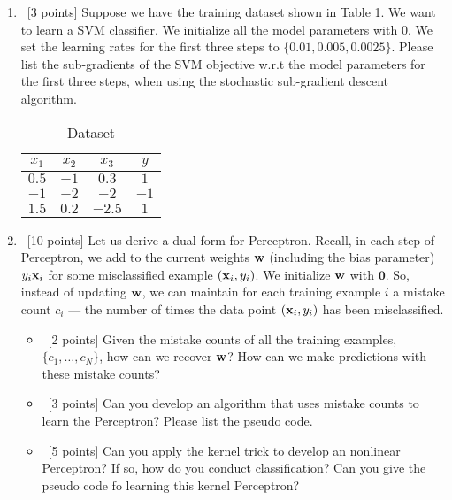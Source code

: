\documentclass[12pt, fullpage,letterpaper]{article}
\begin{document}
\begin{enumerate}
	
	\item~[3 points] Suppose we have the training dataset shown in Table 1. We want to learn a SVM classifier. We initialize all the model parameters with $0$. We set the learning rates for the first three steps to $\{0.01, 0.005, 0.0025\}$.  Please list the sub-gradients of the SVM objective w.r.t the model parameters for the first three steps, when using the stochastic sub-gradient descent algorithm. 
	\begin{table}[h]
		\centering
		\begin{tabular}{ccc|c}
			$x_1$ & $x_2$ & $x_3$ &  $y$\\ 
			\hline\hline
			$0.5$ & $-1$ & $0.3$ & $1$ \\ \hline
			$-1$ & $-2$ & $-2$ & $-1$\\ \hline
			$1.5$ & $0.2$ & $-2.5$ & $1$\\ \hline
		\end{tabular}
	\caption{Dataset}
	\end{table}

	\item~[10 points] Let us derive a dual form for Perceptron. Recall, in each step of Perceptron, we add to the current weights ${\bf w}$ (including the bias parameter) $y_i{\bf x}_i$ for some misclassified example $({\bf x}_i, y_i)$. We initialize ${\bf w}$ with $\mathbf{0}$. So, instead of updating ${\bf w}$, we can maintain for each training example $i$ a mistake count $c_i$ --- the number of times the data point $({\bf x}_i, y_i)$ has been misclassified. 
	
	\begin{itemize}
		\item~[2 points] Given the mistake counts of all the training examples, $\{c_1, \ldots, c_N\}$, how can we recover ${\bf w}$? How can we make predictions with these mistake counts? 
		\item~[3 points] Can you develop an algorithm that uses mistake counts to learn the Perceptron? Please list the pseudo code. 
		\item~[5 points] Can you apply the kernel trick to develop an nonlinear Perceptron? If so, how do you conduct classification? Can you give the pseudo code fo learning this kernel Perceptron? 
	\end{itemize}   
	
\end{enumerate}
\end{document}
